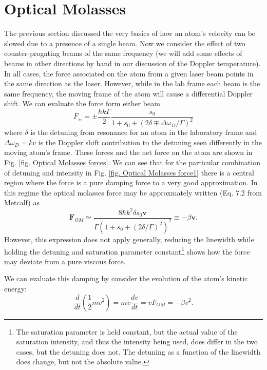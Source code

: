 \documentclass[../../main.tex]{subfiles}
\begin{document}
\section{Optical Molasses}
The previous section discussed the very basics of how an atom's velocity can be slowed due to a presence of a single beam. Now we consider the effect of two counter-progating beams of the same frequency (we will add some effects of beams in other directions by hand in our discussion of the Doppler temperature). In all cases, the force associated on the atom from a given laser beam points in the same direction as the laser. However, while in the lab frame each beam is the same frequency, the moving frame of the atom will cause a differential Doppler shift. We can evaluate the force form either beam
\begin{equation}\label{eq. force from counter propagating beams}
    F_\pm=\pm\frac{\hbar k \Gamma}{2}\frac{s_0}{1+s_0+(2\delta\mp\Delta\omega_D/\Gamma)^2}
\end{equation}
where $\delta$ is the detuning from resonance for an atom in the laboratory frame and $\Delta\omega_D=kv$ is the Doppler shift contribution to the detuning seen differently in the moving atom's frame. These forces and the net force on the atom are shown in Fig. \ref{fig. Optical Molasses forces}. We can see that for the particular combination of detuning and intensity in Fig. \ref{fig. Optical Molasses force1} there is a central region where the force is a pure damping force to a very good approximation. In this regime the optical molasses force may be approxmately written (Eq. 7.2 from Metcalf) as 
\begin{equation}
    \mathbf{F}_{OM}\simeq \frac{8\hbar k^2\delta s_0\mathbf{v}}{\Gamma(1+s_0+(2\delta/\Gamma)^2)^2}\equiv -\beta\mathbf{v}.
\end{equation}
However, this expression does not apply generally, reducing the linewidth while holding the detuning and saturation parameter constant\footnote{The saturation parameter is held constant, but the actual value of the saturation intensity, and thus the intensity being used, does differ in the two cases, but the detuning does not. The detuning as a function of the linewidth does change, but not the absolute value.} shows how the force may deviate from a pure viscous force.

We can evaluate this damping by consider the evolution of the atom's kinetic energy:
\begin{equation}\label{eq. damping along one axis}
    \frac{d}{dt}\left(\frac12mv^2\right)=mv\frac{dv}{dt}=vF_{OM}=-\beta v^2.
\end{equation}
\end{document}
